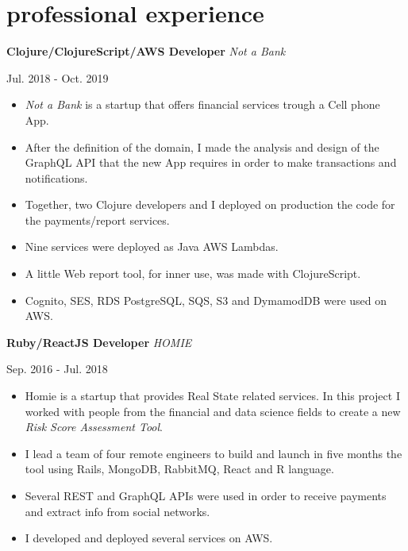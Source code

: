 \documentclass[]{k-cv}
\begin{document}
\newpage

\section{professional experience}

  \textbf{Clojure/ClojureScript/AWS Developer}  \textit{Not a Bank}
  {\color{gray} {\small Jul. 2018 - Oct. 2019 \par}}
  \begin{itemize}
    \item \textit{Not a Bank} is a startup that offers financial services trough a Cell phone App.
    \item After the definition of the domain, I made the analysis and design of the GraphQL API that the new App
          requires in order to make transactions and notifications.
    \item Together, two Clojure developers and I deployed on production the code for the \linebreak
          payments/report services.
    \item Nine services were deployed as Java AWS Lambdas.
    \item A little Web report tool, for inner use, was made with ClojureScript.
    \item Cognito, SES, RDS PostgreSQL, SQS, S3 and DymamodDB were used on AWS.
  \end{itemize}

  \textbf{Ruby/ReactJS Developer}  \textit{HOMIE}
  {\color{gray} {\small Sep. 2016 - Jul. 2018 \par}}
  \begin{itemize}
    \item Homie is a startup that provides Real State related services. In this project I
          worked with people from the financial and data science fields to create a new
          \textit{Risk Score Assessment Tool}.
    \item I lead a team of four remote engineers to build and launch in five months the tool
          using Rails, MongoDB, RabbitMQ, React and R language.
    \item Several REST and GraphQL APIs were used in order to receive payments and extract info from social networks.
    \item I developed and deployed several services on AWS.
  \end{itemize}
\end{document}
